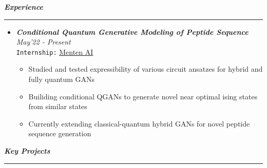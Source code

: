 \documentclass[11pt,a4paper]{article}
\begin{document}
\color{myBlue}
\vspace{0.2cm}
\noindent \Large\textbf{\textit{Experience}} \vspace{0.15cm} \normalsize
\color{gray} \hrule
\color{black}
\begin{itemize}
	\item \textbf{\textit{Conditional Quantum Generative Modeling of Peptide Sequence}} \hfill \textit{May'22 - Present} \\
	\texttt{Internship:} \href{https://www.menten.ai/}{Menten AI}
	\begin{itemize}
		\item Studied and tested expressibility of various circuit ansatzes for hybrid and fully quantum GANs
		\item Builiding conditional QGANs to generate novel near optimal ising states from similar states
		\item Currently extending classical-quantum hybrid GANs for novel peptide sequence generation
	\end{itemize}
\end{itemize}
%
%
%
%
\color{myBlue}
\vspace{0.2cm}
\noindent \Large\textbf{\textit{Key Projects}} \vspace{0.15cm} \normalsize
\color{gray} \hrule
\color{black}
\end{document}
